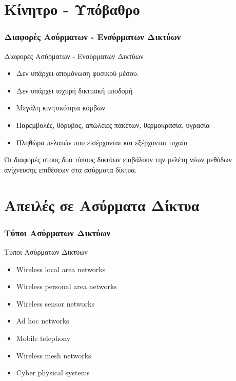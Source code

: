 \documentclass[handouts,hyperref={pdfpagelabels=false}]{beamer}
\begin{document}
\section{\foreignlanguage{greek}{Κίνητρο - Υπόβαθρο}}
\begin{frame}
\frametitle{\foreignlanguage{greek}{Διαφορές Ασύρματων - Ενσύρματων Δικτύων}}
\begin{block}{Διαφορές Ασύρματων - Ενσύρματων Δικτύων}
\begin{itemize}
    \item Δεν υπάρχει απομόνωση φυσικού μέσου.
    \item Δεν υπάρχει ισχυρή δικτυακή υποδομή
    \item Μεγάλη κινητικότητα κόμβων
    \item Παρεμβολές, θόρυβος, απώλειες πακέτων, θερμοκρασία, υγρασία
    \item Πληθώρα πελατών που εισέρχονται και εξέρχονται τυχαία
  \end{itemize}
Οι διαφορές στους δυο τύπους δικτύων επιβάλουν την μελέτη νέων μεθόδων ανίχνευσης επιθέσεων στα ασύρματα δίκτυα.
\end{block}
\end{frame}

\section{\foreignlanguage{greek}{Απειλές σε Ασύρματα Δίκτυα}}
\begin{frame}
\frametitle{\foreignlanguage{greek}{Τύποι Ασύρματων Δικτύων}}
\begin{block}{Τύποι Ασύρματων Δικτύων}
\begin{itemize}
    \item \textlatin{Wireless local area networks}
    \item \textlatin{Wireless personal area networks}
    \item \textlatin{Wireless sensor networks}
    \item \textlatin{Ad hoc networks}
    \item \textlatin{Mobile telephony}
    \item \textlatin{Wireless mesh networks}
    \item \textlatin{Cyber physical systems}
\end{itemize}
\end{block}
\end{frame}
\end{document}
